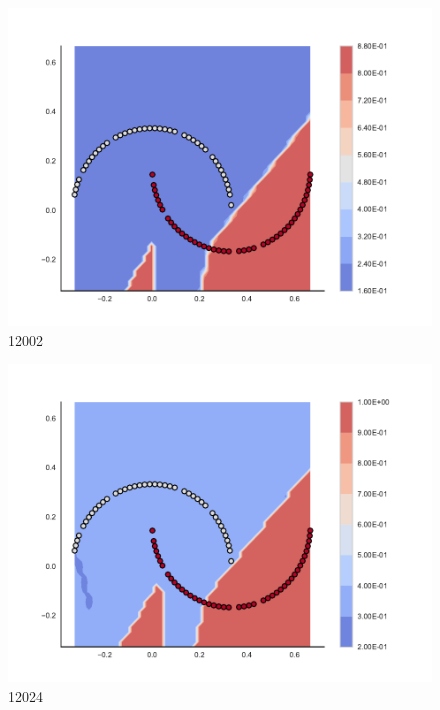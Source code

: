 \begin{subfigure}[b]{0.09\textwidth}
    \includegraphics[clip, trim=2.35cm 1.75cm 4.5cm 0cm,width=\textwidth]{img/convergence/12002.pdf}
    \caption{12002}
    \label{fig:convergence_12002}
\end{subfigure}
%
\begin{subfigure}[b]{0.09\textwidth}
    \includegraphics[clip, trim=2.35cm 1.75cm 4.5cm 0cm,width=\textwidth]{img/convergence/12024.pdf}
    \caption{12024}
    \label{fig:convergence_12024}
\end{subfigure}
%

